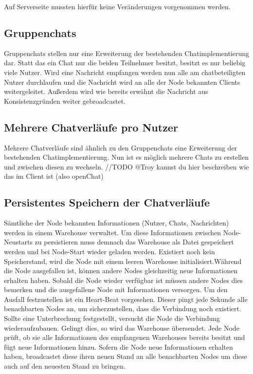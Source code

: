 Auf Serverseite mussten hierfür keine Veränderungen vorgenommen werden.

\author{Matthias Vonend, Aaron Schweig, Troy Keßler}
\subsection{Gruppenchats}
Gruppenchats stellen nur eine Erweiterung der bestehenden Chatimplementierung dar. Statt das ein Chat nur die beiden Teilnehmer besitzt, besitzt es nur beliebig viele Nutzer. Wird eine Nachricht empfangen werden nun alle am chatbeteiligten Nutzer durchlaufen und die Nachricht wird an alle der Node bekannten Clients weitergeleitet. Außerdem wird wie bereits erwähnt die Nachricht aus Konsistenzgründen weiter gebroadcastet.

\author{Matthias Vonend, Troy Keßler}
\subsection{Mehrere Chatverläufe pro Nutzer}
Mehrere Chatverläufe sind ähnlich zu den Gruppenchats eine Erweiterung der bestehenden Chatimplementierung. Nun ist es möglich mehrere Chats zu erstellen und zwischen diesen zu wechseln.
//TODO @Troy kannst du hier beschreiben wie das im Client ist (also openChat)

\author{Matthias Vonend}
\subsection{Persistentes Speichern der Chatverläufe}\label{persistance}
Sämtliche der Node bekannten Informationen (Nutzer, Chats, Nachrichten) werden in einem Warehouse verwaltet. Um diese Informationen zwischen Node-Neustarts zu persistieren muss demnach das Warehouse als Datei gespeichert werden und bei Node-Start wieder geladen werden. Existiert noch kein Speicherstand, wird die Node mit einem leeren Warehouse initialisiert.Während die Node ausgefallen ist, können andere Nodes gleichzeitig neue Informationen erhalten haben. Sobald die Node wieder verfügbar ist müssen andere Nodes dies bemerken und die ausgefallene Node mit Informationen versorgen. Um den Ausfall festzustellen ist ein Heart-Beat vorgesehen. Dieser pingt jede Sekunde alle benachbarten Nodes an, um sicherzustellen, dass die Verbindung noch existiert. Sollte eine Unterbrechung festgestellt, versucht die Node die Verbindung wiederaufzubauen. Gelingt dies, so wird das Warehouse übersendet. Jede Node prüft, ob sie alle Informationen des empfangenen Warehouses bereits besitzt und fügt neue Informationen hinzu. Sofern die Node neue Informationen erhalten haben, broadcastet diese ihren neuen Stand an alle benachbarten Nodes um diese auch auf den neuesten Stand zu bringen.

